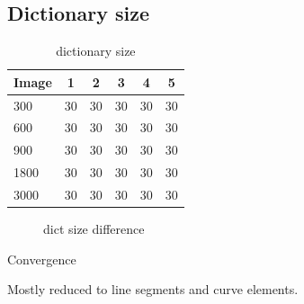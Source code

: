 \subsection{Dictionary size}

\begin{table}[h]
\caption{dictionary size}
\centering
\begin{tabular}{l  c  c  c  c  c}
\toprule
Image & 1 & 2 & 3 & 4 & 5 \\
\hline
300 & 30 & 30 & 30 & 30 & 30 \\
600 & 30 & 30 & 30 & 30 & 30 \\
900 & 30 & 30 & 30 & 30 & 30 \\
1800 & 30 & 30 & 30 & 30 & 30 \\
3000 & 30 & 30 & 30 & 30 & 30 \\
\bottomrule
\end{tabular}
\end{table}

\begin{figure}[h]
\centering
{}
\hspace{5mm}
\caption{dict size difference}
\label{fig:dict size}
\end{figure}


Convergence


Mostly reduced to line segments and curve elements.
